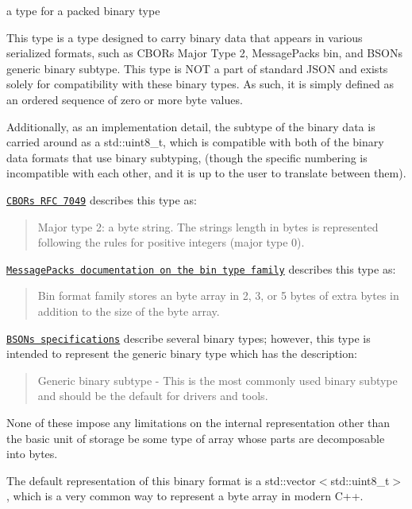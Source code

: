a type for a packed binary type 

This type is a type designed to carry binary data that appears in various serialized formats, such as C\+B\+OR\textquotesingle{}s Major Type 2, Message\+Pack\textquotesingle{}s bin, and B\+S\+ON\textquotesingle{}s generic binary subtype. This type is N\+OT a part of standard J\+S\+ON and exists solely for compatibility with these binary types. As such, it is simply defined as an ordered sequence of zero or more byte values.

Additionally, as an implementation detail, the subtype of the binary data is carried around as a {\ttfamily std\+::uint8\+\_\+t}, which is compatible with both of the binary data formats that use binary subtyping, (though the specific numbering is incompatible with each other, and it is up to the user to translate between them).

\href{https://tools.ietf.org/html/rfc7049}{\tt C\+B\+OR\textquotesingle{}s R\+FC 7049} describes this type as\+: \begin{quote}
Major type 2\+: a byte string. The string\textquotesingle{}s length in bytes is represented following the rules for positive integers (major type 0). \end{quote}


\href{https://github.com/msgpack/msgpack/blob/master/spec.md#bin-format-family}{\tt Message\+Pack\textquotesingle{}s documentation on the bin type family} describes this type as\+: \begin{quote}
Bin format family stores an byte array in 2, 3, or 5 bytes of extra bytes in addition to the size of the byte array. \end{quote}


\href{http://bsonspec.org/spec.html}{\tt B\+S\+ON\textquotesingle{}s specifications} describe several binary types; however, this type is intended to represent the generic binary type which has the description\+: \begin{quote}
Generic binary subtype -\/ This is the most commonly used binary subtype and should be the \textquotesingle{}default\textquotesingle{} for drivers and tools. \end{quote}


None of these impose any limitations on the internal representation other than the basic unit of storage be some type of array whose parts are decomposable into bytes.

The default representation of this binary format is a {\ttfamily std\+::vector$<$std\+::uint8\+\_\+t$>$}, which is a very common way to represent a byte array in modern C++.

